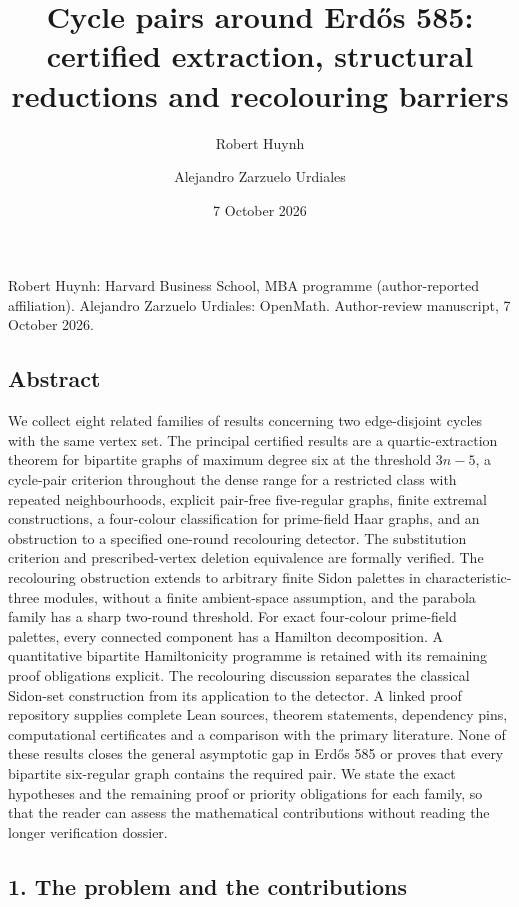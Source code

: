 \documentclass[
  11pt,
]{article}
\title{Cycle pairs around Erdős 585: certified extraction, structural
reductions and recolouring barriers}
\author{Robert Huynh \and Alejandro Zarzuelo Urdiales}
\date{7 October 2026}
\begin{document}
\maketitle

Robert Huynh: Harvard Business School, MBA programme (author-reported
affiliation). Alejandro Zarzuelo Urdiales: OpenMath. Author-review
manuscript, 7 October 2026.

\subsection{Abstract}\label{abstract}

We collect eight related families of results concerning two
edge-disjoint cycles with the same vertex set. The principal certified
results are a quartic-extraction theorem for bipartite graphs of maximum
degree six at the threshold \(3n-5\), a cycle-pair criterion throughout
the dense range for a restricted class with repeated neighbourhoods,
explicit pair-free five-regular graphs, finite extremal constructions, a
four-colour classification for prime-field Haar graphs, and an
obstruction to a specified one-round recolouring detector. The
substitution criterion and prescribed-vertex deletion equivalence are
formally verified. The recolouring obstruction extends to arbitrary
finite Sidon palettes in characteristic-three modules, without a finite
ambient-space assumption, and the parabola family has a sharp two-round
threshold. For exact four-colour prime-field palettes, every connected
component has a Hamilton decomposition. A quantitative bipartite
Hamiltonicity programme is retained with its remaining proof obligations
explicit. The recolouring discussion separates the classical Sidon-set
construction from its application to the detector. A linked proof
repository supplies complete Lean sources, theorem statements,
dependency pins, computational certificates and a comparison with the
primary literature. None of these results closes the general asymptotic
gap in Erdős 585 or proves that every bipartite six-regular graph
contains the required pair. We state the exact hypotheses and the
remaining proof or priority obligations for each family, so that the
reader can assess the mathematical contributions without reading the
longer verification dossier.

\subsection{1. The problem and the
contributions}\label{the-problem-and-the-contributions}
\end{document}
